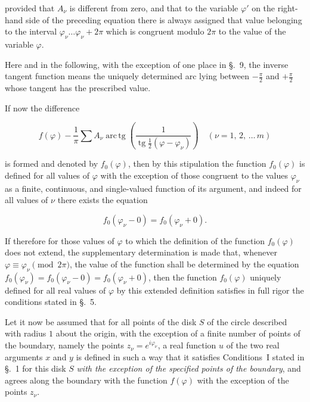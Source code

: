 \documentclass{article}
\begin{document}

provided that $A_\nu$ is different from zero, and that to the variable $\varphi'$ on the right-hand side of the preceding equation there is always assigned that value belonging to the interval $\varphi_\nu \dots \varphi_\nu + 2\pi$ which is congruent modulo $2\pi$ to the value of the variable $\varphi$.



Here and in the following, with the exception of one place in §.~9, the inverse tangent function means the uniquely determined arc lying between $-\frac{\pi}{2}$ and $+\frac{\pi}{2}$ whose tangent has the prescribed value.



If now the difference

\[

f(\varphi) - \frac{1}{\pi} \sum A_\nu \operatorname{arc\,tg}\left(\frac{1}{\operatorname{tg}\frac{1}{2}(\varphi - \varphi_\nu)}\right) \quad (\nu = 1, \, 2, \, \dots \, m)

\]

is formed and denoted by $f_0(\varphi)$, then by this stipulation the function $f_0(\varphi)$ is defined for all values of $\varphi$ with the exception of those congruent to the values $\varphi_\nu$ as a finite, continuous, and single-valued function of its argument, and indeed for all values of $\nu$ there exists the equation

\[

f_0(\varphi_\nu - 0) = f_0(\varphi_\nu + 0).

\]



If therefore for those values of $\varphi$ to which the definition of the function $f_0(\varphi)$ does not extend, the supplementary determination is made that, whenever $\varphi \equiv \varphi_\nu \pmod{2\pi}$, the value of the function shall be determined by the equation $f_0(\varphi_\nu) = f_0(\varphi_\nu - 0) = f_0(\varphi_\nu + 0)$, then the function $f_0(\varphi)$ uniquely defined for all real values of $\varphi$ by this extended definition satisfies in full rigor the conditions stated in §.~5.



Let it now be assumed that for all points of the disk $S$ of the circle described with radius $1$ about the origin, with the exception of a finite number of points of the boundary, namely the points $z_\nu = e^{i\varphi_\nu}$, a real function $u$ of the two real arguments $x$ and $y$ is defined in such a way that it satisfies Conditions~I stated in §.~1 for this disk $S$ \emph{with the exception of the specified points of the boundary}, and agrees along the boundary with the function $f(\varphi)$ with the exception of the points $z_\nu$.
\end{document}
